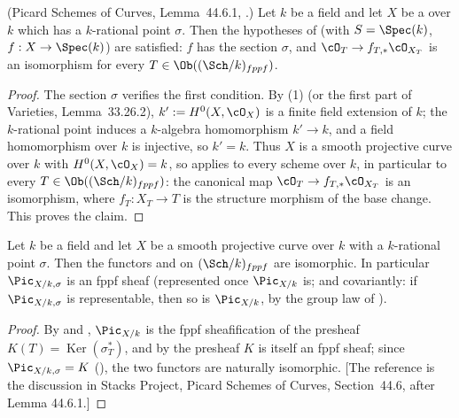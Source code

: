 \begin{lemma}
\label{lem:pc-rational-hyp}
(Picard Schemes of Curves, Lemma~44.6.1,
.)
Let $k$ be a field and let $X$ be a
 over
$k$ which has a $k$-rational point $\sigma$.  Then the hypotheses of
 (with $S=\Spec(k)$, $f:X\to\Spec(k)$) are
satisfied: $f$ has the section $\sigma$, and
$\cO_T\to f_{T,*}\cO_{X_T}$ is an isomorphism for every
$T\in\Ob((\Sch/k)_{fppf})$.
\end{lemma}
\begin{proof}
The section $\sigma$ verifies the first condition.  By
 (1) (or the first part of Varieties,
Lemma~33.26.2), $k':=H^0(X,\cO_X)$ is a finite field extension of $k$;
the $k$-rational point induces a $k$-algebra homomorphism $k'\to k$, and
a field homomorphism over $k$ is injective, so $k'=k$.  Thus $X$ is a
smooth projective curve over $k$ with $H^0(X,\cO_X)=k$, so
 applies to every scheme over $k$, in
particular to every $T\in\Ob((\Sch/k)_{fppf})$: the canonical map
$\cO_T\to f_{T,*}\cO_{X_T}$ is an isomorphism, where $f_T:X_T\to T$ is
the structure morphism of the base change.  This proves the claim.
\end{proof}

\begin{corollary}
\label{cor:pc-sigma-pic-iso}
Let $k$ be a field and let $X$ be a smooth projective curve over $k$ with
a $k$-rational point $\sigma$.  Then the functors
 and
 on
$(\Sch/k)_{fppf}$ are isomorphic.  In particular
$\Pic_{X/k,\sigma}$ is an fppf sheaf (represented once $\Pic_{X/k}$ is;
and covariantly: if $\Pic_{X/k,\sigma}$ is representable, then so is
$\Pic_{X/k}$, by the group law of ).
\end{corollary}
\begin{proof}
By  and ,
$\Pic_{X/k}$ is the fppf sheafification of the presheaf
$K(T)=\operatorname{Ker}(\sigma_T^*)$, and by  the
presheaf $K$ is itself an fppf sheaf; since
$\Pic_{X/k,\sigma}=K$ (), the two functors
are naturally isomorphic.  [The reference is the discussion in Stacks
Project, Picard Schemes of Curves, Section~44.6, after Lemma 44.6.1.]
\end{proof}


